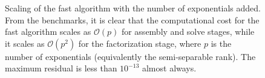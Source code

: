 \documentclass[final,leqno]{siamltex}
\begin{document}
\begin{figure}[!htbp]
{}
\caption{Scaling of the fast algorithm with the number of exponentials added. From the benchmarks, it is clear that the computational cost for the fast algorithm scales as $\mathcal{O}(p)$ for assembly and solve stages, while it scales as $\mathcal{O}(p^2)$ for the factorization stage, where $p$ is the number of exponentials (equivalently the semi-separable rank). The maximum residual is less than $10^{-13}$ almost always.}
\end{figure}
\end{document}
